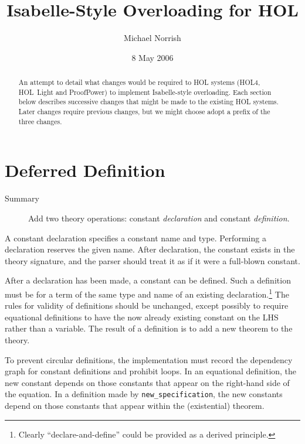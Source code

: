 \documentclass[11pt]{article}
\title{Isabelle-Style Overloading for HOL}
\author{Michael Norrish}
\date{8 May 2006}
\begin{document}
\maketitle
\begin{abstract}
  An attempt to detail what changes would be required to HOL systems
  (HOL4, HOL~Light and ProofPower) to implement Isabelle-style
  overloading.  Each section below describes successive changes that
  might be made to the existing HOL systems.  Later changes require
  previous changes, but we might choose adopt a prefix of the three
  changes.
\end{abstract}

\section{Deferred Definition}
\label{sec:deferred-definition}

\begin{description}
\item[Summary] Add two theory operations: constant \emph{declaration}
  and constant \emph{definition}.
\end{description}

A constant declaration specifies a constant name and type.  Performing
a declaration reserves the given name.  After declaration, the
constant exists in the theory signature, and the parser should treat
it as if it were a full-blown constant.

After a declaration has been made, a constant can be defined.  Such a
definition must be for a term of the same type and name of an existing
declaration.\footnote{Clearly ``declare-and-define'' could be provided
  as a derived principle.} The rules for validity of definitions
should be unchanged, except possibly to require equational definitions
to have the now already existing constant on the LHS rather than a
variable.  The result of a definition is to add a new theorem to the
theory.

To prevent circular definitions, the implementation must record the
dependency graph for constant definitions and prohibit loops.  In an
equational definition, the new constant depends on those constants
that appear on the right-hand side of the equation.  In a definition
made by \texttt{new\_specification}, the new constants depend on those
constants that appear within the (existential) theorem.
\end{document}
